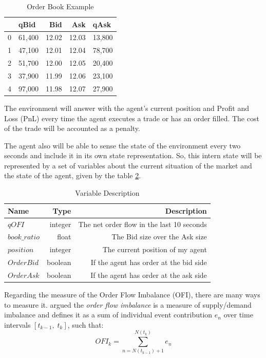 \documentclass[a4paper]{article}
\begin{document}
\begin{table}[ht!]
\centering
\begin{tabular}{l|lrrl}
{} &    qBid &    Bid &    Ask &    qAsk \\
\midrule
0 &  61,400 &  12.02 &  12.03 &  13,800 \\
1 &  47,100 &  12.01 &  12.04 &  78,700 \\
2 &  51,700 &  12.00 &  12.05 &  20,400 \\
3 &  37,900 &  11.99 &  12.06 &  23,100 \\
4 &  97,000 &  11.98 &  12.07 &  27,900 \\

\end{tabular}
\caption{\label{tab:order_book}Order Book Example}
\end{table}

The environment will answer with the agent's current position and Profit and Loss (PnL) every time the agent executes a trade or has an order filled. The cost of the trade will be accounted as a penalty.

The agent also will be able to sense the state of the environment every two seconds and include it in its own state representation. So, this intern state will be represented by a set of variables about the current situation of the market and the state of the agent, given by the table \ref{tab:var_description}.

\begin{table}[ht!]
\centering
\begin{tabular}{lrr}
{Name} &                Type &   Description \\
\midrule
$qOFI$ & integer &  The net order flow in the last 10 seconds \\
$book\_ratio$ & float &    The Bid size over the Ask size \\
$position$ & integer &    The current position of my agent \\
$OrderBid$ & boolean &    If the agent has order at the bid side \\
$OrderAsk$ & boolean &    If the agent has order at the ask side \\

\end{tabular}
\caption{\label{tab:var_description}Variable Description}
\end{table}


Regarding the measure of the Order Flow Imbalance (OFI), there are many ways to measure it. \cite{cont2014price} argued the \textit{order flow imbalance} is a measure of supply/demand imbalance and defines it as a sum of individual event contribution $e_n$ over time intervals $\left[ t_{k-1}, \; t_k \right]$, such that:
$$OFI_k = \sum^{N(t_k)}_{n=N(t_{k-1})+1} e_n$$
\end{document}

